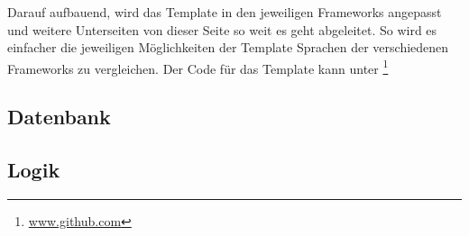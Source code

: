 Darauf aufbauend, wird das Template in den jeweiligen Frameworks angepasst und
weitere Unterseiten von dieser Seite so weit es geht abgeleitet. So wird es
einfacher die jeweiligen Möglichkeiten der Template Sprachen der verschiedenen
Frameworks zu vergleichen. Der Code für das Template kann unter
\footnote{\url{www.github.com}}


\subsection{Datenbank}
\subsection{Logik}